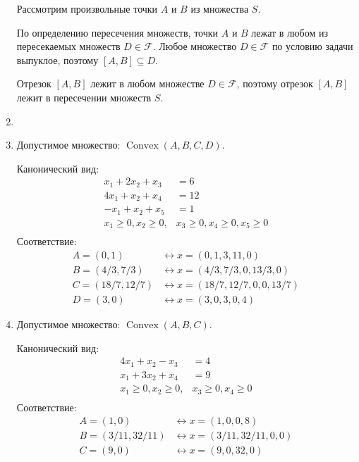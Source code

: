 \documentclass[12pt]{article}
\newcommand{\cF}{\mathcal{F}}
\DeclareMathOperator{\Convex}{Convex}
\DeclareMathOperator{\hull}{\Convex}
\begin{document}
\begin{enumerate}
Рассмотрим произвольные точки $A$ и $B$ из множества $S$. 

По определению пересечения множеств, точки $A$ и $B$ лежат в любом из пересекаемых множеств $D \in \cF$. 
Любое множество $D \in \cF$ по условию задачи выпуклое, поэтому $[A, B] \subseteq D$.

Отрезок $[A, B]$ лежит в любом множестве $D \in \cF$, поэтому отрезок $[A, B]$ лежит в пересечении множеств $S$.

\item 

\item %
Допустимое множество: $\hull(A, B, C, D)$.


Канонический вид:
\begin{align*}
  x_1 + 2x_2 + x_3 &= 6 \\
  4x_1 + x_2 + x_4 &= 12 \\
  -x_1 + x_2 + x_5 &= 1 \\
  x_1 \geq 0, x_2 \geq 0,& x_3 \geq 0, x_4 \geq 0, x_5 \geq 0 \\
\end{align*}
%
Соответствие:
\begin{align*}
  A = (0, 1) &\leftrightarrow x= (0, 1, 3, 11, 0) \\
  B = (4/3, 7/3) &\leftrightarrow x = (4/3, 7/3, 0, 13/3, 0) \\
  C = (18/7, 12/7) &\leftrightarrow x = (18/7, 12/7, 0, 0, 13/7) \\
  D = (3, 0) &\leftrightarrow x = (3, 0, 3, 0, 4)    
\end{align*}

\item %
Допустимое множество: $\hull(A, B, C)$.

Канонический вид:
\begin{align*}
  4x_1 + x_2 - x_3 &= 4 \\
  x_1 + 3x_2 + x_4 &= 9 \\
  x_1 \geq 0, x_2 \geq 0,& x_3 \geq 0, x_4 \geq 0 \\
\end{align*}
%
Соответствие:
\begin{align*}
  A = (1, 0) &\leftrightarrow x = (1, 0, 0, 8) \\
  B = (3/ 11, 32/11) &\leftrightarrow x = (3/11, 32/11, 0, 0) \\
  C = (9, 0) &\leftrightarrow x = (9, 0, 32, 0)
\end{align*}

\end{enumerate}
\end{document}
